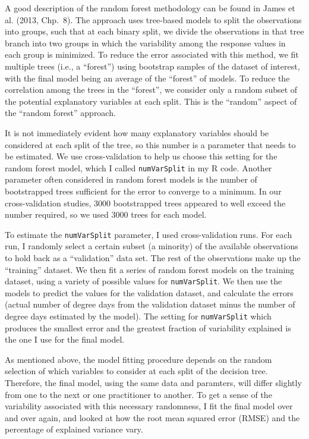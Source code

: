 \documentclass{article}
\begin{document}
A good description of the random forest methodology can be found in
James et al. (2013, Chp.~8).  The approach uses tree-based models to
split the observations into groups, such that at each binary split, we
divide the observations in that tree branch into two groups in which
the variability among the response values in each group is minimized.
To reduce the error associated with this method, we fit multiple trees
(i.e., a ``forest'') using bootstrap samples of the dataset of
interest, with the final model being an average of the ``forest'' of
models.  To reduce the correlation among the trees in the ``forest'',
we consider only a random subset of the potential explanatory
variables at each split.  This is the ``random'' aspect of the
``random forest'' approach.

It is not immediately evident how many explanatory variables should be
considered at each split of the tree, so this number is a parameter
that needs to be estimated.  We use cross-validation to help us choose
this setting for the random forest model, which I called
\texttt{numVarSplit} in my R code.  Another parameter often considered
in random forest models is the number of bootstrapped trees sufficient
for the error to converge to a minimum.  In our cross-validation
studies, 3000 bootstrapped trees appeared to well exceed the number
required, so we used 3000 trees for each model.

To estimate the \texttt{numVarSplit} parameter, I used
cross-validation runs.  For each run, I randomly select a certain
subset (a minority) of the available observations to hold back as a
``validation'' data set.  The rest of the observations make up the
``training'' dataset.  We then fit a series of random forest models on
the training dataset, using a variety of possible values for
\texttt{numVarSplit}.  We then use the models to predict the values
for the validation dataset, and calculate the errors (actual number of
degree days from the validation dataset minus the number of degree
days estimated by the model).  The setting for \texttt{numVarSplit}
which produces the smallest error and the greatest fraction of
variability explained is the one I use for the final model.

As mentioned above, the model fitting procedure depends on the random
selection of which variables to consider at each split of the decision
tree.  Therefore, the final model, using the same data and paramters,
will differ slightly from one to the next or one practitioner to
another.  To get a sense of the variability associated with this
necessary randomness, I fit the final model over and over again, and
looked at how the root mean squared error (RMSE) and the percentage of
explained variance vary.
\end{document}
